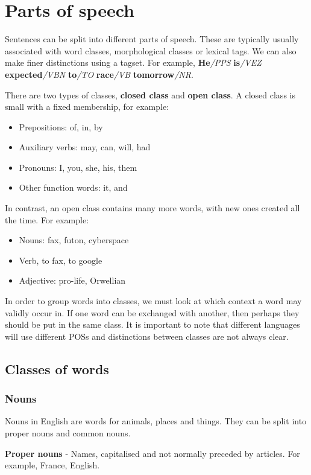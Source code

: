 \documentclass[Report.tex]{subfiles}
\begin{document}
\section{Parts of speech}
Sentences can be split into different parts of speech. These are
typically usually associated with word classes, morphological classes
or lexical tags. We can also make finer distinctions using a tagset.
For example, \textbf{He}\textit{/PPS} \textbf{is}\textit{/VEZ} 
\textbf{expected}\textit{/VBN} \textbf{to}\textit{/TO} \textbf{race}\textit{/VB}
\textbf{tomorrow}\textit{/NR}.

There are two types of classes, \textbf{closed class} and \textbf{open class}.
A closed class is small with a fixed membership, for example:
\begin{itemize}
\item Prepositions: of, in, by
\item Auxiliary verbs: may, can, will, had
\item Pronouns: I, you, she, his, them
\item Other function words: it, and
\end{itemize}

In contrast, an open class contains many more words, with new ones created
all the time. For example:
\begin{itemize}
\item Nouns: fax, futon, cyberspace
\item Verb, to fax, to google
\item Adjective: pro-life, Orwellian
\end{itemize}

In order to group words into classes, we must look at which context a word
may validly occur in. If one word can be exchanged with another, then
perhaps they should be put in the same class. It is important to note
that different languages will use different POSs and distinctions
between classes are not always clear.

\subsection{Classes of words}
\subsubsection{Nouns}
Nouns in English are words for animals, places and things. They can be split
into proper nouns and common nouns.

\textbf{Proper nouns} - Names, capitalised and not normally preceded by articles.
For example, France, English.
\end{document}
